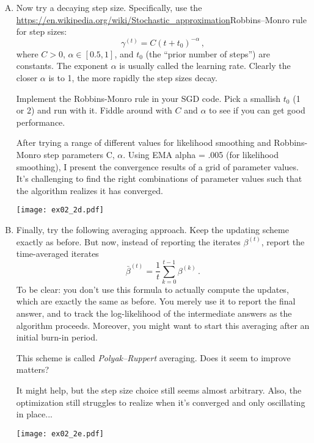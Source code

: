 \documentclass{article}
\begin{document}
\begin{enumerate}[(A)]
\item Now try a decaying step size.  Specifically, use the \url{https://en.wikipedia.org/wiki/Stochastic_approximation}{Robbins--Monro} rule for step sizes:
$$
\gamma^{(t)} = C (t + t_0)^{-\alpha} \, ,
$$
where $C > 0$, $\alpha \in [0.5, 1]$, and $t_0$ (the ``prior number of steps'') are constants.  The exponent $\alpha$ is usually called the learning rate.  Clearly the closer $\alpha$ is to 1, the more rapidly the step sizes decay.

Implement the Robbins-Monro rule in your SGD code. Pick a smallish $t_0$ (1 or 2) and run with it.   Fiddle around with $C$ and $\alpha$ to see if you can get good performance. 

\color{blue}
After trying a range of different values for likelihood smoothing and Robbins-Monro step parameters C, $\alpha$. Using EMA alpha = .005 (for likelihood smoothing), I present the convergence results of a grid of parameter values. It's challenging to find the right combinations of parameter values such that the algorithm realizes it has converged. 
\begin{center}
\texttt{[image: ex02\_2d.pdf]}
\end{center}
\color{black}

\item Finally, try the following averaging approach.  Keep the updating scheme exactly as before.  But now, instead of reporting the iterates $\beta^{(t)}$, report the time-averaged iterates
$$
\bar{\beta}^{(t)} = \frac{1}{t} \sum_{k=0}^{t-1} \beta^{(k)} \, .
$$
To be clear: you don't use this formula to actually compute the updates, which are exactly the same as before.  You merely use it to report the final answer, and to track the log-likelihood of the intermediate answers as the algorithm proceeds.  Moreover, you might want to start this averaging after an initial burn-in period.

This scheme is called \textit{Polyak--Ruppert} averaging.  Does it seem to improve matters?

\color{blue}
It might help, but the step size choice still seems almost arbitrary. Also, the optimization still struggles to realize when it's converged and only oscillating in place... 
\begin{center}
\texttt{[image: ex02\_2e.pdf]}
\end{center}
\color{black}

\end{enumerate}
\end{document}
